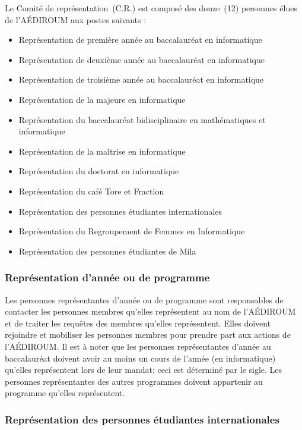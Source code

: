\documentclass{aediroum}
\begin{document}
Le Comité de représentation~(C.R.) est composé des douze~(12) personnes élues de
l’AÉDIROUM aux postes suivants :
\begin{itemize}
\item Représentation de première année au baccalauréat en informatique
\item Représentation de deuxième année au baccalauréat en informatique
\item Représentation de troisième année au baccalauréat en informatique
\item Représentation de la majeure en informatique
\item Représentation du baccalauréat bidisciplinaire en mathématiques et informatique
\item Représentation de la maîtrise en informatique
\item Représentation du doctorat en informatique
\item Représentation du café Tore et Fraction
\item Représentation des personnes étudiantes internationales
\item Représentation du Regroupement de Femmes en Informatique
\item Représentation des personnes étudiantes de Mila
\end{itemize}

\subsubsection{Représentation d'année ou de programme}\label{sec:representant-dannee-ou-de-programme}

Les personnes représentantes d'année ou de programme sont responsables de contacter les personnes membres qu'elles représentent au nom de l'AÉDIROUM et de traiter les requêtes des membres qu'elles représentent. Elles doivent rejoindre et mobiliser les personnes membres pour prendre part aux actions de l'AÉDIROUM. Il est à noter que les personnes représentantes d'année au baccalauréat doivent avoir au moins un cours de l'année (en informatique) qu'elles représentent lors de leur mandat; ceci est déterminé par le sigle. Les personnes représentantes des autres programmes doivent appartenir au programme qu'elles représentent.

\subsubsection{Représentation des personnes étudiantes internationales}\label{sec:representant-des-etudiants-internationaux}
\end{document}
